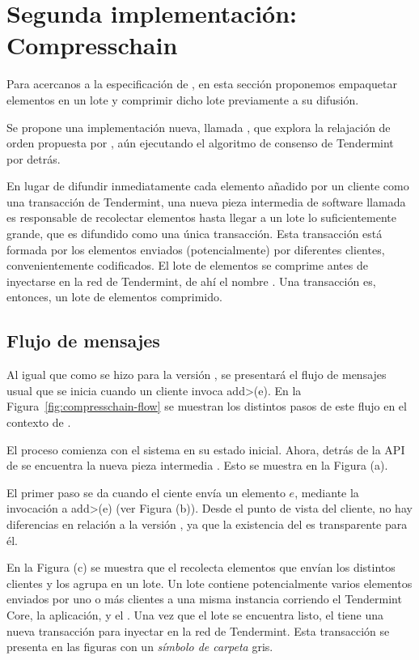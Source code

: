 \section{Segunda implementación: Compresschain}\label{sec:compresschain}

Para acercanos a la especificación de \setchain, en esta sección proponemos
empaquetar elementos en un lote y comprimir dicho lote
previamente a su difusión.
%

Se propone una implementación nueva, llamada \compresschain, que explora
la relajación de orden propuesta por \setchain, aún ejecutando el algoritmo de
consenso de Tendermint por detrás.
%

En lugar de difundir inmediatamente cada elemento añadido por un cliente como una
transacción de Tendermint, una nueva pieza intermedia de software llamada \collector
es responsable de recolectar elementos hasta llegar a un lote lo suficientemente grande,
que es difundido como una única transacción.
%
Esta transacción está formada por los elementos
enviados (potencialmente) por diferentes clientes, convenientemente codificados.
%
El lote de elementos se comprime antes de inyectarse en la red de Tendermint, de ahí el nombre
\compresschain.
%
Una transacción es, entonces, un lote de elementos comprimido.

\subsection{Flujo de mensajes}
Al igual que como se hizo para la versión \vanilla, se presentará el flujo de mensajes usual
que se inicia cuando un cliente invoca \<add>(e).
En la Figura~\ref{fig:compresschain-flow} se muestran los distintos pasos de
este flujo en el contexto de \compresschain.
%

El proceso comienza con el sistema en su estado inicial. Ahora, detrás de la API de \setchain
se encuentra la nueva pieza intermedia \collector. Esto se muestra en la Figura (a).

%

El primer paso se da cuando el ciente envía un elemento $e$, mediante la invocación a \<add>(e) (ver
Figura (b)).
Desde el punto de vista del cliente, no hay diferencias en relación a la versión \vanilla, ya que
la existencia del \collector es transparente para él.

%

En la Figura (c) se muestra que el \collector recolecta elementos que envían los distintos clientes y los agrupa
en un lote.
Un lote contiene potencialmente varios elementos enviados por uno o más clientes a una misma instancia
corriendo el Tendermint Core, la aplicación, y el \collector.
Una vez que el lote se encuentra listo, el \collector tiene una nueva transacción para inyectar en la red de Tendermint.
Esta transacción se presenta en las figuras con un \textit{símbolo de carpeta} gris.

